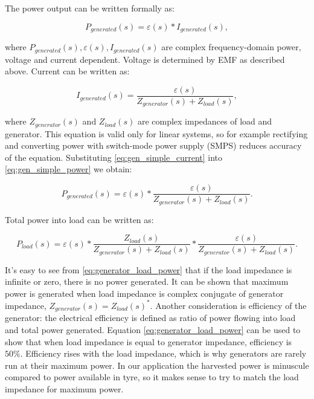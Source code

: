 The power output can be written formally as:

\begin{equation} \label{eq:gen_simple_power}
  P_{generated}(s) = \varepsilon(s)*I_{generated}(s),
\end{equation}

where $P_{generated}(s), \varepsilon(s), I_{generated}(s)$ are complex frequency-domain power, voltage and current dependent. Voltage is determined by EMF as described above. Current can be written as: 

\begin{equation} \label{eq:gen_simple_current}
  I_{generated}(s) = \frac{\varepsilon(s)}{Z_{generator}(s)+Z_{load}(s)},
\end{equation}

where $Z_{generator}(s) $ and $ Z_{load}(s)$ are complex impedances of load and generator. This equation is valid only for linear systems, so for example rectifying and converting power with switch-mode power supply (SMPS) reduces accuracy of the equation. Substituting \eqref{eq:gen_simple_current} into \eqref{eq:gen_simple_power} we obtain:

\begin{equation}
  P_{generated}(s) = \varepsilon(s)*\frac{\varepsilon(s)}{Z_{generator}(s)+Z_{load}(s)}.
\end{equation}

Total power into load can be written as:

\begin{equation} \label{eq:generator_load_power}
  P_{load}(s) = \varepsilon(s)*\frac{Z_{load}(s)}{Z_{generator}(s)+Z_{load}(s)}*\frac{\varepsilon(s)}{Z_{generator}(s)+Z_{load}(s)}.
\end{equation}

It's easy to see from \eqref{eq:generator_load_power} that if the load impedance is infinite or zero, there is no power generated. It can be shown that maximum power is generated when load impedance is complex conjugate of generator impedance, $Z_{generator}(s) = {Z_{load}(s)}^*$. Another consideration is efficiency of the generator: the electrical efficiency is defined as ratio of power flowing into load and total power generated. Equation \eqref{eq:generator_load_power} can be used to show that when load impedance is equal to generator impedance, efficiency is $ 50 \%$. Efficiency rises with the load impedance, which is why generators are rarely run at their maximum power. In our application the harvested power is minuscule compared to power available in tyre, so it makes sense to try to match the load impedance for maximum power.


